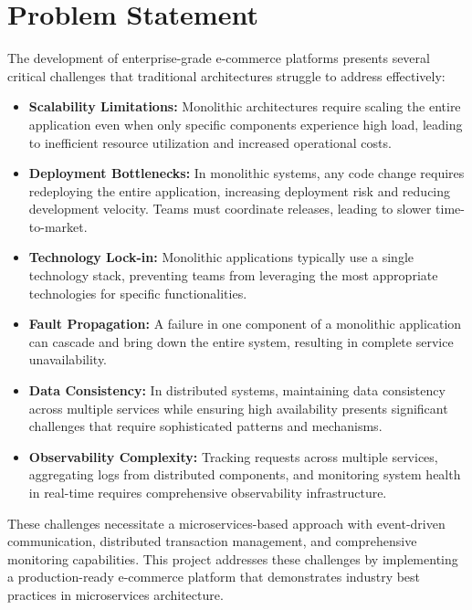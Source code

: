 \section{Problem Statement}

The development of enterprise-grade e-commerce platforms presents several critical challenges that traditional architectures struggle to address effectively:

\begin{itemize}
    \item \textbf{Scalability Limitations:} Monolithic architectures require scaling the entire application even when only specific components experience high load, leading to inefficient resource utilization and increased operational costs.
    
    \item \textbf{Deployment Bottlenecks:} In monolithic systems, any code change requires redeploying the entire application, increasing deployment risk and reducing development velocity. Teams must coordinate releases, leading to slower time-to-market.
    
    \item \textbf{Technology Lock-in:} Monolithic applications typically use a single technology stack, preventing teams from leveraging the most appropriate technologies for specific functionalities.
    
    \item \textbf{Fault Propagation:} A failure in one component of a monolithic application can cascade and bring down the entire system, resulting in complete service unavailability.
    
    \item \textbf{Data Consistency:} In distributed systems, maintaining data consistency across multiple services while ensuring high availability presents significant challenges that require sophisticated patterns and mechanisms.
    
    \item \textbf{Observability Complexity:} Tracking requests across multiple services, aggregating logs from distributed components, and monitoring system health in real-time requires comprehensive observability infrastructure.
\end{itemize}

These challenges necessitate a microservices-based approach with event-driven communication, distributed transaction management, and comprehensive monitoring capabilities. This project addresses these challenges by implementing a production-ready e-commerce platform that demonstrates industry best practices in microservices architecture.

